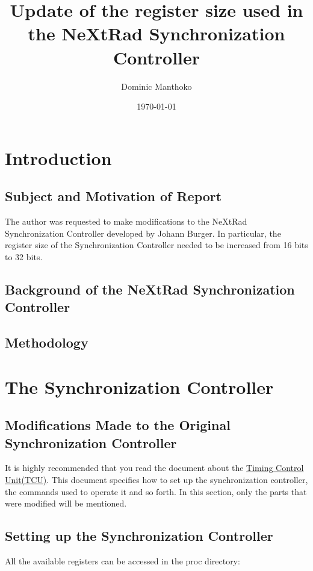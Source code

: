 \documentclass[12pt, a4paper]{article}
\title{Update of the register size used in the NeXtRad Synchronization Controller}
\author{Dominic Manthoko}
\date{\today}
\begin{document}
\maketitle

\sloppy


\section{Introduction}

\subsection{Subject and Motivation of Report}
The author was requested to make modifications to the NeXtRad Synchronization Controller developed by Johann Burger. In particular, the register size of the Synchronization Controller needed to be increased from 16 bits to 32 bits. 

\subsection{Background of the NeXtRad Synchronization Controller}


\subsection{Methodology}

\section{The Synchronization Controller}
\subsection{Modifications Made to the Original Synchronization Controller}
It is highly recommended that you read the document about the \href{https://docs.google.com/document/d/1E-mxDRlNcjSsjckUj8SuQOPBRs8Zv4AUUxXzLDHU3zc/edit?usp=sharing}{Timing Control Unit(TCU)}. This document specifies how to set up the synchronization controller, the commands used to operate it and so forth. In this section, only the parts that were modified will be mentioned.

\subsection{Setting up the Synchronization Controller} \label{syn_control_setup}
All the available registers can be accessed in the proc directory:
\end{document}
